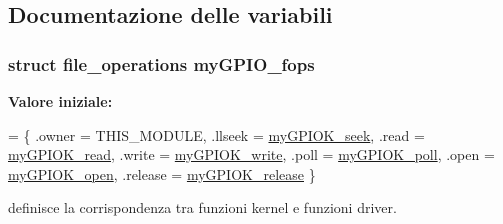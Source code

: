 \subsection{Documentazione delle variabili}
\hypertarget{group___kernel-_module_ga9f31111fdb3b4a5944e18d45045e0f01}{
\subsubsection[{my\+G\+P\+I\+O\+\_\+fops}]{\setlength{\rightskip}{0pt plus 5cm}struct file\+\_\+operations my\+G\+P\+I\+O\+\_\+fops\hspace{0.3cm}{\ttfamily [static]}}}\label{group___kernel-_module_ga9f31111fdb3b4a5944e18d45045e0f01}
{\bfseries Valore iniziale\+:}
\begin{DoxyCode}
= \{
        .owner      = THIS\_MODULE,
        .llseek     = \hyperlink{group___kernel-_module_gaee309b7824d1efb418d9aa5e8c888c7c}{myGPIOK\_seek},
        .read       = \hyperlink{group___kernel-_module_gac03e8e943c9886549d64625253b8c4bf}{myGPIOK\_read},
        .write      = \hyperlink{group___kernel-_module_ga93f7a4111f4555747323e4afcb1343fd}{myGPIOK\_write},
        .poll       = \hyperlink{group___kernel-_module_ga27a9fd0cd8497c6fb4415ffcf0733270}{myGPIOK\_poll},
        .open       = \hyperlink{group___kernel-_module_ga7aa7d2d19eb7034855c87a17e433918d}{myGPIOK\_open},
        .release    = \hyperlink{group___kernel-_module_gaf310cbdd4b64b3e108ed0cd67374fa9b}{myGPIOK\_release}
\}
\end{DoxyCode}


definisce la corrispondenza tra funzioni kernel e funzioni driver. 

